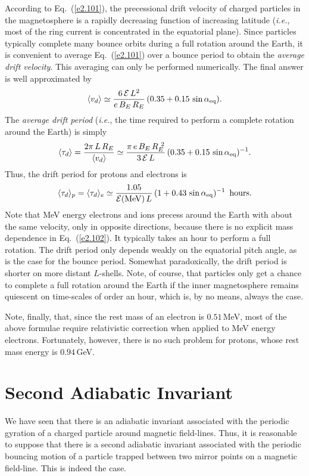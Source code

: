 According to Eq.~(\ref{e2.101}), the precessional drift velocity of charged particles
in the magnetosphere is a rapidly decreasing function of increasing latitude
({\em i.e.}, most of the ring current is concentrated in the equatorial plane).
Since particles typically complete many bounce orbits during a full rotation around
the Earth, it is convenient to average Eq.~(\ref{e2.101}) over a bounce
period to obtain the {\em average drift velocity}. This averaging can
only be performed numerically. The final answer is well approximated by
\begin{equation}\label{e2.102}
\langle v_d\rangle \simeq \frac{6\,{\cal E}\,L^2}{e\,B_E\,R_E}
\,(0.35 + 0.15\,\sin\alpha_{\rm eq}).
\end{equation}
The {\em average drift period}\/ ({\em i.e.}, the time required to
perform a complete rotation around the Earth) is simply
\begin{equation}
\langle \tau_d\rangle = \frac{2\pi\,L\,R_E}{\langle v_d\rangle}
\simeq \frac{\pi\,e\,B_E\,R_E^{~2}}{3\,{\cal E}\,L} \,
(0.35 + 0.15\,\sin\alpha_{\rm eq})^{-1}.
\end{equation}
Thus, the drift period for protons and electrons is
\begin{equation}
\langle \tau_d\rangle_p=\langle \tau_d\rangle_e \simeq \frac{1.05}{{\cal E}({\rm MeV})\,L} \,(1+0.43\,\sin\alpha_{\rm eq})^{-1}\,\,\,{\rm hours}.
\end{equation}
Note that MeV energy electrons and ions  precess around the Earth with about the same
velocity, only in opposite directions, because there is no explicit
mass dependence in Eq.~(\ref{e2.102}). It typically takes an hour to perform a full
rotation. 
The drift period only depends weakly on
the equatorial pitch angle, as is the case for the bounce period. 
Somewhat paradoxically, the drift period is
shorter on more distant $L$-shells. 
Note, of course, that particles only get a chance to complete a 
full rotation around the Earth if the inner magnetosphere remains quiescent
on time-scales of order an hour, which is, by no means, always the case. 

Note, finally, that, since the rest mass of an electron is $0.51$\,MeV, most
of the above formulae require relativistic correction when applied to
MeV energy electrons. 
Fortunately, however, there is no such problem for protons, whose rest mass
energy is $0.94$\,GeV.

\section{Second Adiabatic Invariant}
We have seen that there is an adiabatic invariant associated with the
periodic gyration of a charged particle around magnetic field-lines.
Thus, it is reasonable to suppose that there is a second adiabatic invariant
associated with the periodic bouncing motion of a particle trapped 
between two mirror points on
a magnetic field-line. This is indeed the case. 

